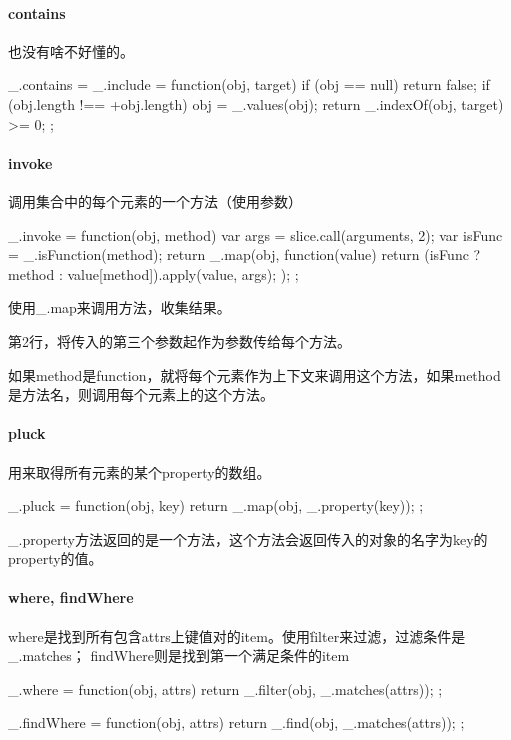 \paragraph{contains} 也没有啥不好懂的。
 
\begin{JavaScript}
  _.contains = _.include = function(obj, target) {
    if (obj == null) return false;
    if (obj.length !== +obj.length) obj = _.values(obj);
    return _.indexOf(obj, target) >= 0;
  };
\end{JavaScript}

\paragraph{invoke} 调用集合中的每个元素的一个方法（使用参数）

\begin{JavaScript}
  _.invoke = function(obj, method) {
    var args = slice.call(arguments, 2);
    var isFunc = _.isFunction(method);
    return _.map(obj, function(value) {
      return (isFunc ? method : value[method]).apply(value, args);
    });
  };
\end{JavaScript}

使用\_.map来调用方法，收集结果。

第2行，将传入的第三个参数起作为参数传给每个方法。

如果method是function，就将每个元素作为上下文来调用这个方法，如果method是方法名，则调用每个元素上的这个方法。

\paragraph{pluck} 用来取得所有元素的某个property的数组。

\begin{JavaScript}
  _.pluck = function(obj, key) {
    return _.map(obj, _.property(key));
  };
\end{JavaScript}

\_.property方法返回的是一个方法，这个方法会返回传入的对象的名字为key的property的值。


\paragraph{where, findWhere} where是找到所有包含attrs上键值对的item。使用\.filter来过滤，过滤条件是\_.matches； findWhere则是找到第一个满足条件的item

\begin{JavaScript}
  _.where = function(obj, attrs) {
    return _.filter(obj, _.matches(attrs));
  };
  
  _.findWhere = function(obj, attrs) {
    return _.find(obj, _.matches(attrs));
  };
\end{JavaScript}

